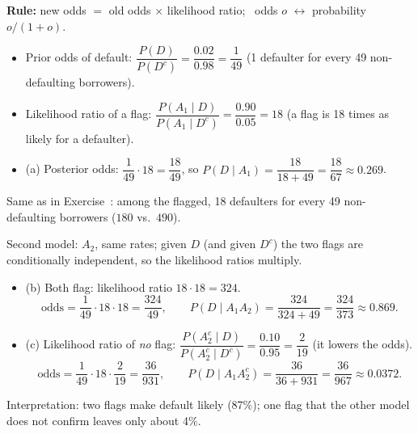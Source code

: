 \begin{slides}
	\small
	\exstatement
	\pause
	\sol \textbf{Rule:} new odds $=$ old odds $\times$ likelihood ratio;
	\ odds $o$ $\leftrightarrow$ probability $o/(1+o)$.
	\pause
	\begin{itemize}
		\item Prior odds of default:
		      $\dfrac{P(D)}{P(D^c)}=\dfrac{0.02}{0.98}=\dfrac{1}{49}$
		      \quad (1 defaulter for every 49 non-defaulting borrowers).
		      \pause
		\item Likelihood ratio of a flag:
		      $\dfrac{P(A_1\mid D)}{P(A_1\mid D^c)}=\dfrac{0.90}{0.05}=18$
		      \quad (a flag is 18 times as likely for a defaulter).
		      \pause
		\item (a) Posterior odds: $\dfrac{1}{49}\cdot18=\dfrac{18}{49}$,
		      \quad so
		      $P(D\mid A_1)=\dfrac{18}{18+49}=\dfrac{18}{67}\approx0.269$.
	\end{itemize}
	\pause
	Same as in Exercise~: among the flagged, 18
	defaulters for every 49 non-defaulting borrowers ($180$ vs.\ $490$).
\end{slides}

\begin{slides}
	\small
	Second model: $A_2$, same rates; given $D$ (and given $D^c$) the two flags
	are conditionally independent, so the likelihood ratios \alert{multiply}.
	\pause
	\begin{itemize}
		\item (b) Both flag: likelihood ratio $18\cdot18=324$.
		      \[ \text{odds}=\frac{1}{49}\cdot18\cdot18=\frac{324}{49},\qquad
			      P(D\mid A_1A_2)=\frac{324}{324+49}=\frac{324}{373}\approx0.869. \]
		      \pause
		\item (c) Likelihood ratio of \emph{no} flag:
		      $\dfrac{P(A_2^c\mid D)}{P(A_2^c\mid D^c)}=\dfrac{0.10}{0.95}
			      =\dfrac{2}{19}$ \quad (it lowers the odds).
		      \pause
		      \[ \text{odds}=\frac{1}{49}\cdot18\cdot\frac{2}{19}=\frac{36}{931},
			      \qquad P(D\mid A_1A_2^c)=\frac{36}{36+931}=\frac{36}{967}
			      \approx0.0372. \]
		      \pause
	\end{itemize}
	\alert{Interpretation:} two flags make default likely (87\%); one flag
	that the other model does not confirm leaves only about 4\%.
\end{slides}

